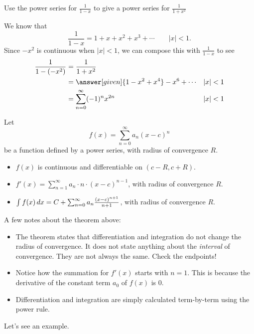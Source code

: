\documentclass{ximera}
\begin{document}
\begin{example}
  Use the power series for $\frac{1}{1-x}$ to give a power series for $\frac{1}{1+x^2}$
  \begin{explanation}
    We know that
    \[
    \frac{1}{1-x}= 1+ x+ x^2 + x^3 + \cdots\qquad|x|< 1.
    \]
    Since $-x^2$ is continuous when $|x|<1$, we can compose this with $\frac{1}{1-x}$ to see
    \begin{align*}
    \frac{1}{1-(-x^2)} &=\frac{1}{1+x^2}\\
    &= \answer[given]{1 - x^2 + x^4} - x^6 + \cdots &|x|< 1\\
    &= \sum_{n=0}^\infty (-1)^n x^{2n} &|x|< 1
    \end{align*}
  \end{explanation}
\end{example}

\begin{theorem}
  Let
  \[
  f(x) = \sum_{n=0}^\infty a_n(x-c)^n
  \]
  be a function defined by a power series, with radius of convergence $R$.
  \begin{itemize}
  \item $f(x)$ is continuous and differentiable on $(c-R,c+R)$.
  \item	$f'(x) = \sum_{n=1}^\infty a_n\cdot n\cdot (x-c)^{n-1}$, with radius of convergence $R$.
  \item	$\int f(x) \mathop{}\!d x = C+\sum_{n=0}^\infty a_n\frac{(x-c)^{n+1}}{n+1}$, with radius of convergence $R$.
  \end{itemize}
\end{theorem}
A few notes about the theorem above:
\begin{itemize}
\item The theorem states that differentiation and integration do not
  change the radius of convergence. It does not state anything about
  the \textit{interval} of convergence. They are not always the same.  Check the endpoints!
\item Notice how the summation for $f'(x)$ starts with $n=1$. This is
  because the derivative of the constant term $a_0$ of $f(x)$ is $0$.
\item Differentiation and integration are simply calculated
  term-by-term using the power rule.
\end{itemize}

Let's see an example.
\end{document}
